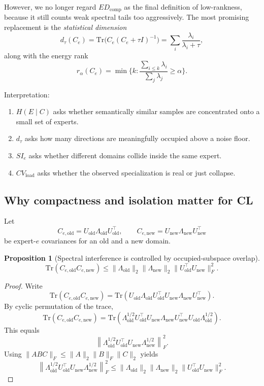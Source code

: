 \documentclass[11pt]{article}
\newtheorem{proposition}{Proposition}
\begin{document}
However, we no longer regard $ED_{\mathrm{comp}}$ as the final definition of low-rankness, because it still counts weak spectral tails too aggressively. The most promising replacement is the \emph{statistical dimension}
\[
d_\tau(C_e)
=
\mathrm{Tr}\!\big(C_e(C_e+\tau I)^{-1}\big)
=
\sum_i \frac{\lambda_i}{\lambda_i+\tau},
\]
along with the energy rank
\[
r_\alpha(C_e)
=
\min\Big\{k:\frac{\sum_{i\le k}\lambda_i}{\sum_j \lambda_j}\ge \alpha\Big\}.
\]

Interpretation:
\begin{enumerate}
    \item $H(E\mid C)$ asks whether semantically similar samples are concentrated onto a small set of experts.
    \item $d_\tau$ asks how many directions are meaningfully occupied above a noise floor.
    \item $SI_e$ asks whether different domains collide inside the same expert.
    \item $CV_{\mathrm{load}}$ asks whether the observed specialization is real or just collapse.
\end{enumerate}

\subsection{Why compactness and isolation matter for CL}

Let
\[
C_{e,\mathrm{old}} = U_{\mathrm{old}}\Lambda_{\mathrm{old}}U_{\mathrm{old}}^\top,
\qquad
C_{e,\mathrm{new}} = U_{\mathrm{new}}\Lambda_{\mathrm{new}}U_{\mathrm{new}}^\top
\]
be expert-$e$ covariances for an old and a new domain.

\begin{proposition}[Spectral interference is controlled by occupied-subspace overlap]
\[
\mathrm{Tr}(C_{e,\mathrm{old}} C_{e,\mathrm{new}})
\le
\|\Lambda_{\mathrm{old}}\|_2
\|\Lambda_{\mathrm{new}}\|_2
\|U_{\mathrm{old}}^\top U_{\mathrm{new}}\|_F^2.
\]
\end{proposition}

\begin{proof}
Write
\[
\mathrm{Tr}(C_{e,\mathrm{old}} C_{e,\mathrm{new}})
=
\mathrm{Tr}\!\left(
U_{\mathrm{old}}\Lambda_{\mathrm{old}}U_{\mathrm{old}}^\top
U_{\mathrm{new}}\Lambda_{\mathrm{new}}U_{\mathrm{new}}^\top
\right).
\]
By cyclic permutation of the trace,
\[
\mathrm{Tr}(C_{e,\mathrm{old}} C_{e,\mathrm{new}})
=
\mathrm{Tr}\!\left(
\Lambda_{\mathrm{old}}^{1/2}
U_{\mathrm{old}}^\top U_{\mathrm{new}}
\Lambda_{\mathrm{new}}
U_{\mathrm{new}}^\top U_{\mathrm{old}}
\Lambda_{\mathrm{old}}^{1/2}
\right).
\]
This equals
\[
\left\|
\Lambda_{\mathrm{old}}^{1/2}
U_{\mathrm{old}}^\top U_{\mathrm{new}}
\Lambda_{\mathrm{new}}^{1/2}
\right\|_F^2.
\]
Using $\|ABC\|_F \le \|A\|_2 \|B\|_F \|C\|_2$ yields
\[
\left\|
\Lambda_{\mathrm{old}}^{1/2}
U_{\mathrm{old}}^\top U_{\mathrm{new}}
\Lambda_{\mathrm{new}}^{1/2}
\right\|_F^2
\le
\|\Lambda_{\mathrm{old}}\|_2
\|\Lambda_{\mathrm{new}}\|_2
\|U_{\mathrm{old}}^\top U_{\mathrm{new}}\|_F^2.
\]
\end{proof}
\end{document}
